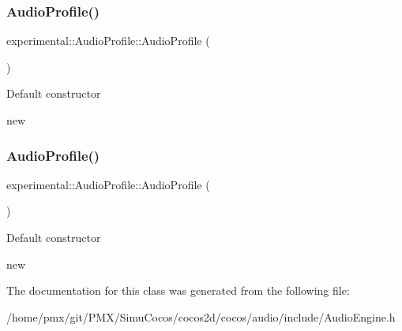 \subsubsection{\texorpdfstring{Audio\+Profile()}{AudioProfile()}\hspace{0.1cm}{\footnotesize\ttfamily [1/2]}}
{\footnotesize\ttfamily experimental\+::\+Audio\+Profile\+::\+Audio\+Profile (\begin{DoxyParamCaption}{ }\end{DoxyParamCaption})\hspace{0.3cm}{\ttfamily [inline]}}

Default constructor

new \mbox{\label{classexperimental_1_1AudioProfile_a209e96757b21ff3b7fd6d480c4b6d4ae}} 
\subsubsection{\texorpdfstring{Audio\+Profile()}{AudioProfile()}\hspace{0.1cm}{\footnotesize\ttfamily [2/2]}}
{\footnotesize\ttfamily experimental\+::\+Audio\+Profile\+::\+Audio\+Profile (\begin{DoxyParamCaption}{ }\end{DoxyParamCaption})\hspace{0.3cm}{\ttfamily [inline]}}

Default constructor

new 

The documentation for this class was generated from the following file\+:\begin{DoxyCompactItemize}
\item 
/home/pmx/git/\+P\+M\+X/\+Simu\+Cocos/cocos2d/cocos/audio/include/Audio\+Engine.\+h\end{DoxyCompactItemize}
